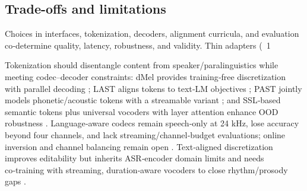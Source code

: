 \subsection{Trade-offs and limitations} \label{subsec:Trade-offs and limitations}

Choices in interfaces, tokenization, decoders, alignment curricula, and evaluation co‑determine quality, latency, robustness, and validity. Thin adapters (~1%

Tokenization should disentangle content from speaker/paralinguistics while meeting codec–decoder constraints: dMel provides training‑free discretization with parallel decoding \cite{bai2025dmelspeechtokenizationmadesimple}; LAST aligns tokens to text‑LM objectives \cite{turetzky2024lastlanguagemodelawarespeechtokenization}; PAST jointly models phonetic/acoustic tokens with a streamable variant \cite{har-tuv2025pastphoneticacousticspeechtokenizer}; and SSL‑based semantic tokens plus universal vocoders with layer attention enhance OOD robustness \cite{mousavi2024howshouldweextractdiscreteaudiotokenssel}. Language‑aware codecs remain speech‑only at 24 kHz, lose accuracy beyond four channels, and lack streaming/channel‑budget evaluations; online inversion and channel balancing remain open \cite{ji2025languagecodecbridgingdiscreterepresentat}. Text‑aligned discretization improves editability but inherits ASR‑encoder domain limits and needs co‑training with streaming, duration‑aware vocoders to close rhythm/prosody gaps \cite{tsunoo2024decoderonlyarchitecturespeechrecognition}.

